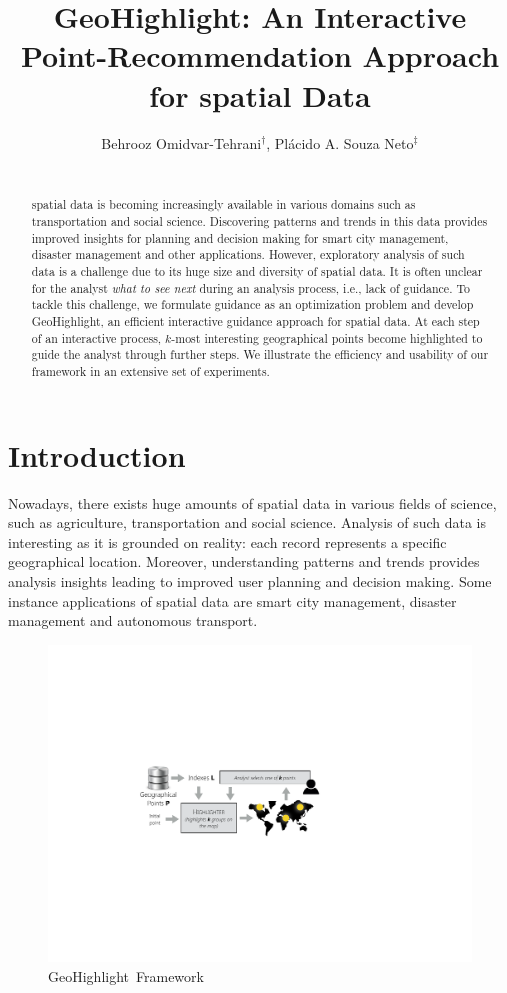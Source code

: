 \documentclass{vldb}
\title{GeoHighlight: An Interactive Point-Recommendation Approach for spatial Data}
\author{
Behrooz Omidvar-Tehrani$^{\dag}$, Pl\'acido A. Souza Neto$^{\ddag}$\\
\affaddr{
$^{\dag}$The Ohio State University, USA, $^{\ddag}$Federal Institute of Rio Grande do Norte - IFRN, Brazil}\\
\affaddr{
$^{\dag}$\path{omidvar-tehrani.1@osu.edu},
$^{\ddag}$\path{placido.neto@ifrn.edu.br}
}}
\date{}
\newcommand{\framework}{{\sc GeoHighlight}}
\begin{document}
\maketitle

\begin{abstract}
spatial data is becoming increasingly available in various domains such as transportation and social science. Discovering patterns and trends in this data provides improved insights for planning and decision making for smart city management, disaster management and other applications. However, exploratory analysis of such data is a challenge due to its huge size and diversity of spatial data. It is often unclear for the analyst {\em what to see next} during an analysis process, i.e., lack of guidance. To tackle this challenge, we formulate guidance as an optimization problem and develop \framework, an efficient interactive guidance approach for spatial data. At each step of an interactive process, $k$-most interesting geographical points become highlighted to guide the analyst through further steps. We illustrate the efficiency and usability of our framework in an extensive set of experiments.
\end{abstract}

\section{Introduction} 
Nowadays, there exists huge amounts of spatial data in various fields of science, such as agriculture, transportation and social science. Analysis of such data is interesting as it is grounded
on reality: each record represents a specific geographical location. Moreover, understanding patterns and trends provides analysis insights leading to improved user planning and decision making. Some instance applications of spatial data are smart city management, disaster management and autonomous transport.

\begin{figure}[t]
  \centering
  \includegraphics[width=\columnwidth]{figs/framework}
\caption{\framework\ Framework}
\label{fig:framework}
\vspace{-10pt}
\end{figure}
\end{document}
